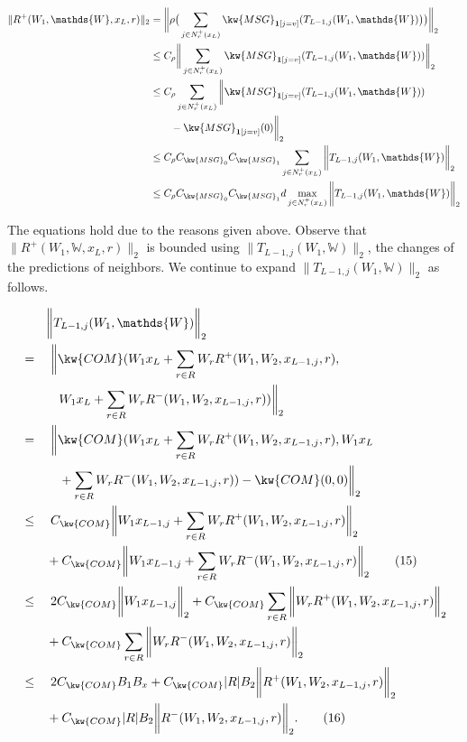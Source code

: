 \begin{align*}
  \|R^+(W_{1},\mathds{W},x_{L},r)\|_{2} 
 & =\bigg\|\rho\big(\sum_{j\in N_r^+(x_{L})}\kw{MSG}_{{\bf 1}[j=v]}(T_{L-1,j}(W_{1},\mathds{W})
 \big)\big)\bigg\|_{2} \\
 & \leq C_\rho\bigg\|\sum_{j\in N_r^+(x_L)}\kw{MSG}_{{\bf 1}[j=v]}(T_{L-1,j}(W_1,\mathds{W}))\bigg\|
 _2 \\
 & \leq C_\rho\sum_{j\in N_r^+(x_L)}\bigg\|\kw{MSG}_{{\bf 1}[j=v]}(T_{L-1,j}(W_1,
 \mathds{W}))\\
 &\quad\quad -\kw{MSG}_{{\bf 1}[j=v]}(0)\bigg\|_2 \\
 & \leq C_{\rho}C_{\kw{MSG}_0}C_{\kw{MSG}_1}\sum_{j\in N_r^+(x_{L})}\bigg\|T_{L-1,j}(W_{1},\mathds{W})
 \bigg\|_{2} \\
 & \leq C_\rho C_{\kw{MSG}_0}C_{\kw{MSG}_1}d\max_{j\in N_r^+(x_L)}\bigg\|T_{L-1,j}(W_1,\mathds{W})\bigg\|_2
\end{align*}


The equations hold due to the reasons given above.
Observe that $\|R^+(W_{1},\mathds{W},x_{L},r)\|_{2}$ 
is bounded using $\bigg\|T_{L-1,j}(W_1,\mathds{W})\bigg\|_2$,
\ie the changes of the predictions of neighbors.
We continue to expand $\bigg\|T_{L-1,j}(W_1,\mathds{W})\bigg\|_2$
as follows.


\begin{align*}
		&\quad\quad\bigg\|T_{L-1,j}(W_1,\mathds{W})\bigg\|_2\\
		 &=\quad\bigg\|\kw{COM}(W_{1}x_{L}+\sum_{r\in R} W_r R^+(W_1,W_2,x_{L-1,j},r),
		\\
		&\quad\quad\quad W_{1}x_{L}+\sum_{r\in R} W_r R^-(W_1,W_2,x_{L-1,j},r)) \bigg\|
_2 \\
		& =\quad\bigg\|\kw{COM}(W_{1}x_{L}+\sum_{r\in R} W_r R^+(W_1,W_2,x_{L-1,j},r),
W_{1}x_{L}\\
&\quad\quad\quad+\sum_{r\in R} W_r R^-(W_1,W_2,x_{L-1,j},r)) -
\kw{COM}(0,0) \bigg\|
_2 \\
		& \leq\quad C_{\kw{COM}}\bigg\|W_{1}x_{L-1,j}+\sum_{r\in R} W_r 
		R^+(W_{1},W_{2},x_{L-1,j},r)\bigg\|_{2} \\
		&\quad\quad+  C_{\kw{COM}}\bigg\|W_{1}x_{L-1,j}+\sum_{r\in R} W_r 
R^-(W_{1},W_{2},x_{L-1,j},r)\bigg\|_{2} \tag{15} \\
		& \leq\quad 2C_{\kw{COM}}\bigg\|W_{1}x_{L-1,j}\bigg\|_{2}+C_{\kw{COM}}\sum_{r\in R} \bigg\|
		W_rR^+(W_{1},W_{2},x_{L-1,j},r)\bigg\|_{2} \\
		&\quad\quad+ C_{\kw{COM}}\sum_{r\in R} \bigg\|
		W_rR^-(W_{1},W_{2},x_{L-1,j},r)\bigg\|_{2}\\
		& \leq\quad 2C_{\kw{COM}}B_{1}B_{x}+C_{\kw{COM}}|R|B_{2}\bigg\|
		R^+(W_{1},W_{2},x_{L-1,j},r)\bigg\|_{2}\\
		&\quad\quad+C_{\kw{COM}}|R|B_{2}\bigg\|
		R^-(W_{1},W_{2},x_{L-1,j},r)\bigg\|_{2}.  \tag{16}
\end{align*}


